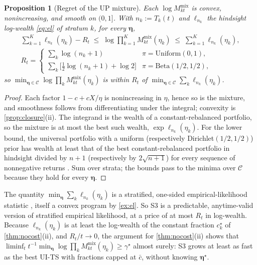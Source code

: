 \documentclass[11pt]{article}
\newcommand{\bs}{\boldsymbol}
\newcommand{\calC}{\mathcal{C}}
\newcommand{\mix}{\mathrm{mix}}
\newcommand{\cbar}{\bar c}
\theoremstyle{plain}
\newtheorem{proposition}[theorem]{Proposition}
\theoremstyle{definition}
\theoremstyle{remark}
\begin{document}
\begin{proposition}[Regret of the UP mixture]\label{prop:regret}
Each $\log M^{\mix}_{kt}$ is convex, nonincreasing, and smooth on $(0,1]$.  With $n_k := T_k(t)$ and $\ell_{n_k}$ the
hindsight log-wealth \eqref{eq:el} of stratum $k$, for every $\bs\eta$,
\begin{gather*}
\sum_{k=1}^K \ell_{n_k}(\eta_k) - R_t \;\le\; \log\prod_{k=1}^K M^{\mix}_{kt}(\eta_k) \;\le\; \sum_{k=1}^K \ell_{n_k}(\eta_k),\\
R_t = \begin{cases}\sum_k\log(n_k+1) & \pi=\mathrm{Uniform}(0,1),\\[2pt]
\sum_k\bigl[\tfrac12\log(n_k+1)+\log2\bigr] & \pi=\mathrm{Beta}(1/2,1/2),\end{cases}
\end{gather*}
so $\min_{\bs\eta\in\calC}\log\prod_k M^{\mix}_{kt}(\eta_k)$ is within $R_t$ of $\min_{\bs\eta\in\calC}\sum_k\ell_{n_k}(\eta_k)$.
\end{proposition}

\begin{proof}
Each factor $1-c+cX/\eta$ is nonincreasing in $\eta$, hence so is the mixture, and smoothness follows from
differentiating under the integral; convexity is \cref{prop:closure}(ii).  The integrand is the wealth of a
constant-rebalanced portfolio, so the mixture is at most the best such wealth, $\exp\ell_{n_k}(\eta_k)$.  For the lower
bound, the universal portfolio with a uniform (respectively Dirichlet$(1/2,1/2)$) prior has wealth at least that of the
best constant-rebalanced portfolio in hindsight divided by $n+1$ (respectively by $2\sqrt{n+1}$) for every sequence of
nonnegative returns \citep{cover1996universal}.  Sum over strata; the bounds pass to the minima over $\calC$ because they
hold for every $\bs\eta$.
\end{proof}

The quantity $\min_{\bs\eta}\sum_k\ell_{n_k}(\eta_k)$ is a stratified, one-sided empirical-likelihood statistic
\citep[cf.][]{owen1988empirical}, itself a convex program by \cref{ex:el}.  So S3 is a predictable, anytime-valid version of
stratified empirical likelihood, at a price of at most $R_t$ in log-wealth.  Because $\ell_{n_k}(\eta_k)$ is at least the
log-wealth of the constant fraction $c^\star_k$ of \cref{thm:nocost}(ii), and $R_t/t\to0$, the argument for
\cref{thm:nocost}(ii) shows that $\liminf_t t^{-1}\min_{\bs\eta}\log\prod_kM^{\mix}_{kt}(\eta_k)\ge\gamma^\star$ almost surely: S3
grows at least as fast as the best UI-TS with fractions capped at $\cbar$, without knowing $\bs\eta^\star$.
\end{document}
